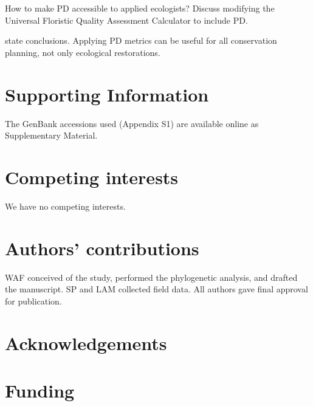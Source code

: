 \documentclass[twocolumn,superscriptaddress,showkeys]{revtex4}
\begin{document}
How to make PD accessible to applied ecologists? Discuss
modifying the Universal Floristic Quality Assessment Calculator \cite{Freyman2013}
to include PD.


state conclusions.
Applying PD metrics can be useful for all conservation planning, not only ecological restorations.

\section{Supporting Information}

The GenBank accessions used (Appendix S1) are available online as Supplementary Material. 

\section{Competing interests}

We have no competing interests.

\section{Authors' contributions}

WAF conceived of the study, performed the phylogenetic analysis, and drafted the manuscript. 
SP and LAM collected field data. All authors gave final approval for publication.

\section{Acknowledgements}

\section{Funding}


\end{document}
